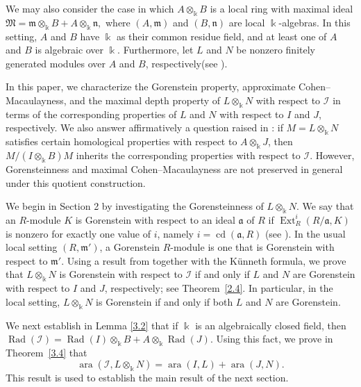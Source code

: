 \documentclass[10pt,a4paper]{amsart}
\numberwithin{equation}{theorem}
\theoremstyle{definition}
\theoremstyle{fact}
\theoremstyle{conjecture}
\newcommand{\ara}{\operatorname{ara}}
\newcommand{\cd}{\operatorname{cd}}
\newcommand{\Ext}{\operatorname{Ext}}
\newcommand{\Rad}{\operatorname{Rad}}
\begin{document}
We may also consider the case in which $A\otimes_\Bbbk B$ is a local
ring with maximal ideal
$
\mathfrak{M}
=\mathfrak{m}\otimes_\Bbbk B+A\otimes_\Bbbk\mathfrak{n},
$
where $(A,\mathfrak{m})$ and $(B,\mathfrak{n})$ are local
$\Bbbk$-algebras. In this setting, $A$ and $B$ have $\Bbbk$ as their
common residue field, and at least one of $A$ and $B$ is algebraic
over $\Bbbk$.
Furthermore, let $L$ and $N$ be nonzero finitely generated modules
over $A$ and $B$, respectively(see \cite{R4}).

 In this paper, we characterize the
Gorenstein property, approximate Cohen--Macaulayness, and the maximal
depth property of $L\otimes_\Bbbk N$ with respect to $\mathcal{I}$
in terms of the corresponding properties of $L$ and $N$ with respect
to $I$ and $J$, respectively. We also answer affirmatively a question raised in \cite{R5}:
 if $M=L\otimes_\Bbbk N$ satisfies certain homological properties with respect to $A\otimes_\Bbbk J$,
  then $M/(I\otimes_\Bbbk B)M$ inherits the corresponding properties with respect to $\mathcal{I}$.
   However, Gorensteinness and maximal Cohen--Macaulayness are not preserved in general under this quotient construction.

We begin in Section 2 by investigating the Gorensteinness of
$L\otimes_{\Bbbk} N$.  We say that an $R$-module $K$
is Gorenstein with respect to an ideal $\mathfrak{a}$ of $R$ if
$\Ext^i_R(R/\mathfrak{a},K)$ is nonzero for exactly one value of
$i$, namely $i=\cd(\mathfrak{a},R)$ (see \cite{PDR}).
In the usual local setting $(R,\mathfrak{m'})$, a Gorenstein
$R$-module is one that is Gorenstein with respect to $\mathfrak{m'}$.
Using a result from \cite{R4} together with the Künneth formula,
we prove that $L\otimes_{\Bbbk} N$ is Gorenstein with respect to
$\mathcal{I}$ if and only if $L$ and $N$ are Gorenstein with respect
to $I$ and $J$, respectively; see Theorem~\ref{2.4}.
In particular, in the local setting, $L\otimes_{\Bbbk} N$ is
Gorenstein if and only if both $L$ and $N$ are Gorenstein.



We next establish in Lemma \ref{3.2} that if $\Bbbk$ is an algebraically closed field, then
  $\Rad(\mathcal{I})= \Rad(I) \otimes_\Bbbk B + A \otimes_\Bbbk \Rad(J)$.  Using this fact, we prove in Theorem~\ref{3.4} that
 \[
\ara(\mathcal{I}, L \otimes_\Bbbk N)
= \ara(I, L) + \ara(J, N).
\]
This result is used to establish the main result of the next section.
\end{document}
